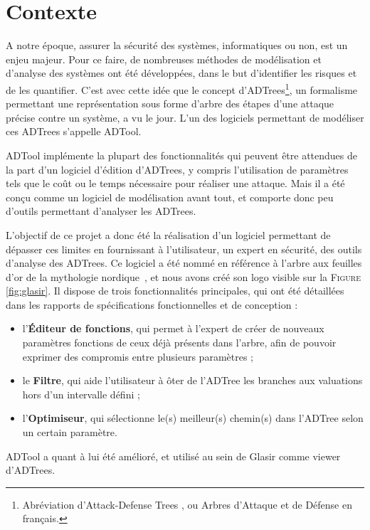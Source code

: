 \section{Contexte}
\label{Contexte}

    A notre époque, assurer la sécurité des systèmes, informatiques ou non, est un enjeu majeur. Pour ce faire, de nombreuses méthodes de modélisation et d'analyse des systèmes ont été développées, dans le but d'identifier les risques et de les quantifier. C'est avec cette idée que le concept d'ADTrees\footnote{Abréviation d'\og Attack-Defense Trees \fg{}, ou \og Arbres d'Attaque et de Défense\fg{} en français.}, un formalisme permettant une représentation sous forme d'arbre des étapes d'une attaque précise contre un système, a vu le jour. L'un des logiciels permettant de modéliser ces ADTrees s'appelle ADTool.

    ADTool implémente la plupart des fonctionnalités qui peuvent être attendues de la part d'un logiciel d'édition d'ADTrees, y compris l'utilisation de paramètres tels que le coût ou le temps nécessaire pour réaliser une attaque. Mais il a été conçu comme un logiciel de modélisation avant tout, et comporte donc peu d'outils permettant d'analyser les ADTrees. 

    L'objectif de ce projet a donc été la réalisation d'un logiciel permettant de dépasser ces limites en fournissant à l'utilisateur, un expert en sécurité, des outils d'analyse des ADTrees. Ce logiciel a été nommé \glasir{} en référence à l'arbre aux feuilles d'or de la mythologie nordique~\cite{vikingCulture}, et nous avons créé son logo visible sur la \textsc{Figure} \ref{fig:glasir}. Il dispose de trois fonctionnalités principales, qui ont été détaillées dans les rapports de spécifications fonctionnelles et de conception :    
\begin{itemize}
    	\item l'{\bf Éditeur de fonctions}, qui permet à l'expert de créer de nouveaux paramètres fonctions de ceux déjà présents dans l'arbre, afin de pouvoir exprimer des compromis entre plusieurs paramètres ;
    	\item le {\bf Filtre}, qui aide l'utilisateur à ôter de l'ADTree les branches aux valuations hors d'un intervalle défini ;
    	\item l'{\bf Optimiseur}, qui sélectionne le(s) meilleur(s) chemin(s) dans l'ADTree selon un certain paramètre.
\end{itemize} 
ADTool a quant à lui été amélioré, et utilisé au sein de Glasir comme viewer d'ADTrees. 

